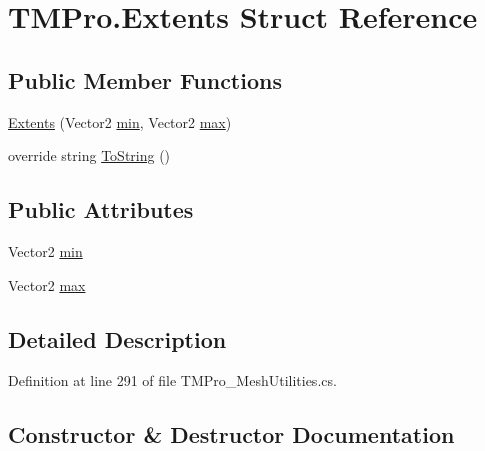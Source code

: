 \hypertarget{struct_t_m_pro_1_1_extents}{}\section{T\+M\+Pro.\+Extents Struct Reference}
\label{struct_t_m_pro_1_1_extents}
\subsection*{Public Member Functions}
\begin{DoxyCompactItemize}
\item 
\mbox{\hyperlink{struct_t_m_pro_1_1_extents_aab33707f8f4c5a4ca2e31a6111dedef9}{Extents}} (Vector2 \mbox{\hyperlink{struct_t_m_pro_1_1_extents_ad0a4cd82c4401ee45b524969f1395d5a}{min}}, Vector2 \mbox{\hyperlink{struct_t_m_pro_1_1_extents_a4eab903aebb23dbbb53be3c41bafbff9}{max}})
\item 
override string \mbox{\hyperlink{struct_t_m_pro_1_1_extents_af4dd4e8effac8721fb5b27e5af9a3574}{To\+String}} ()
\end{DoxyCompactItemize}
\subsection*{Public Attributes}
\begin{DoxyCompactItemize}
\item 
Vector2 \mbox{\hyperlink{struct_t_m_pro_1_1_extents_ad0a4cd82c4401ee45b524969f1395d5a}{min}}
\item 
Vector2 \mbox{\hyperlink{struct_t_m_pro_1_1_extents_a4eab903aebb23dbbb53be3c41bafbff9}{max}}
\end{DoxyCompactItemize}


\subsection{Detailed Description}


Definition at line 291 of file T\+M\+Pro\+\_\+\+Mesh\+Utilities.\+cs.



\subsection{Constructor \& Destructor Documentation}
\mbox{\label{struct_t_m_pro_1_1_extents_aab33707f8f4c5a4ca2e31a6111dedef9}} 
